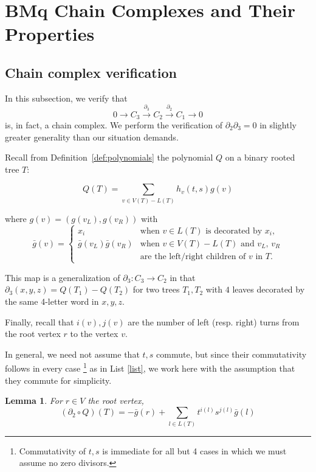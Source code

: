 \documentclass[11pt]{amsart}
\newtheorem{lemma}[theorem]{Lemma}
\theoremstyle{definition}
\begin{document}
\section{BMq Chain Complexes and Their Properties}\label{S:chain}

\subsection{Chain complex verification}\label{partialsquared}
In this subsection, we verify that 
\[ 0 \to C_3 \xrightarrow{\partial_3} C_2 \xrightarrow{\partial_2} C_1 \to 0 \]
 is, in fact, a chain complex. We perform the verification of $\partial_2 \partial_3 = 0$ in slightly greater generality than our situation demands.

 Recall from Definition~\ref{def:polynomials} the polynomial $Q$ on a binary rooted tree $T$:



\[ Q(T) = \sum_{v \in V(T) - L(T)} h_v(t,s) g(v) \]

where $g(v) = (g(v_L), g(v_R))$ with 
\[
\bar g(v)=
\left\{
\begin{array}{ll}
x_i & \mbox{when $v\in L(T)$ is decorated by $x_i$},\\
\bar g(v_L)\bar g(v_R) & \mbox{when $v\in V(T)-L(T)$ and $v_L$, $v_R$} \\
& \mbox{are the left/right children of $v$ in $T$}.
\end{array}
\right.
\]
 
This map is a generalization of $\partial_3: C_3 \to C_2$ in that 
$\partial_3(x,y,z) = Q(T_1) - Q(T_2)$ for two trees $T_1, T_2$ with $4$ leaves decorated by the same 4-letter word in $x,y,z$. 

Finally, recall that $i(v), j(v)$ are the number of left (resp. right) turns from the root vertex $r$ to the vertex $v.$ 

In general, we need not assume that $t,s$ commute, but since their commutativity follows in every case \footnote{Commutativity of $t,s$ is immediate for all but 4 cases in which we must assume no zero divisors.}  as in List \ref{list}, we work here with the assumption that they commute for simplicity. 

\begin{lemma}
    For  $r \in V$ the root vertex,
    \[ (\partial_2 \circ Q)(T) = - \bar{g}(r) + \sum_{l \in L(T)} t^{i(l)} s^{j(l)}\bar{g}(l) \]
\end{lemma}
\end{document}
